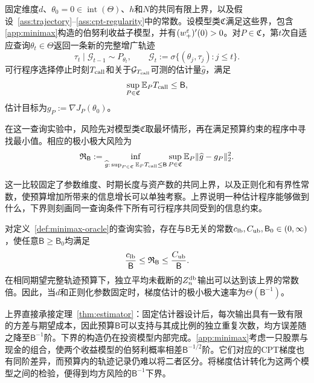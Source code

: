 \begin{definition}[完整轨迹查询实验]\label{def:minimax-oracle}
固定维度$d$、$\theta_0=0\in\operatorname{int}(\Theta)$、$h$和$N$的共同有限上界，以及假设~\ref{ass:trajectory}--\ref{ass:cpt-regularity}中的常数。设模型类$\mathfrak C$满足这些界，包含\ref{app:minimax}构造的伯努利收益子模型，并有$(w_+^\varepsilon)'(0)>0$。对$P\in\mathfrak C$，第$t$次自适应查询$\theta_t\in\Theta$返回一条新的完整增广轨迹
\[
 \tau_t\mid\mathcal G_{t-1}\sim P_{\theta_t},
 \qquad
 \mathcal G_t:=\sigma\{(\theta_j,\tau_j):j\le t\}.
\]
可行程序选择停止时刻$T_{\rm call}$和关于$\mathcal G_{T_{\rm call}}$可测的估计量$\widehat g$，满足
\begin{equation}\label{eq:minimax-budget}
 \sup_{P\in\mathfrak C}\mathbb E_P T_{\rm call}\le\mathsf B,
\end{equation}
估计目标为$g_P:=\nabla J_P(\theta_0)$。
\end{definition}

在这一查询实验中，风险先对模型类$\mathfrak C$取最坏情形，再在满足预算约束的程序中寻找最小值。相应的极小极大风险为
\begin{equation}\label{eq:minimax-risk}
 \mathfrak R_{\mathsf B}
 :=\inf_{\widehat g:\,\sup_{P\in\mathfrak C}\mathbb E_P T_{\rm call}\le\mathsf B}
 \sup_{P\in\mathfrak C}
 \mathbb E_P\lVert\widehat g-g_P\rVert_2^2.
\end{equation}

这一比较固定了参数维度、时期长度与资产数的共同上界，以及正则化和有界性常数，使预算增加所带来的信息增长可以单独考察。上界说明一种估计程序能够做到什么，下界则刻画同一查询条件下所有可行程序共同受到的信息约束。

\begin{theorem}[固定维度下的最优轨迹预算率]\label{thm:minimax}
对定义~\ref{def:minimax-oracle}的查询实验，存在与$\mathsf B$无关的常数$c_{\rm lb},C_{\rm ub},\mathsf B_0\in(0,\infty)$，使任意$\mathsf B\ge\mathsf B_0$均满足
\begin{equation}\label{eq:minimax-rate}
 \frac{c_{\rm lb}}{\mathsf B}
 \le \mathfrak R_{\mathsf B}
 \le \frac{C_{\rm ub}}{\mathsf B}.
\end{equation}
在相同期望完整轨迹预算下，独立平均未截断的$Z_n^{\mathrm{db}}$输出可以达到该上界的常数倍。因此，当$d$和正则化参数固定时，梯度估计的极小极大速率为$\Theta(\mathsf B^{-1})$。
\end{theorem}

上界直接承接定理~\ref{thm:estimator}：固定估计器设计后，每次输出具有一致有限的方差与期望成本，因此预算$\mathsf B$可以支持与其成比例的独立重复次数，均方误差随之降至$\mathsf B^{-1}$阶。下界的构造仍在投资模型内部完成。\ref{app:minimax}考虑一只股票与现金的组合，使两个收益模型的伯努利概率相差$\mathsf B^{-1/2}$阶。它们对应的CPT梯度也有同阶差异，而预算内的轨迹记录仍难以将二者区分。将梯度估计转化为这两个模型之间的检验，便得到均方风险的$\mathsf B^{-1}$下界。

